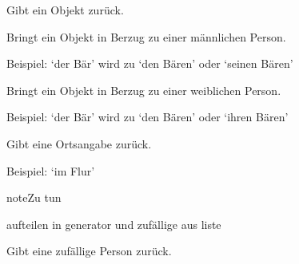 \documentclass[a4paper,12pt,oneside]{sphinxmanual}
\begin{document}

\begin{fulllineitems}
\label{module:pyzufall.generator.objekt}
Gibt ein Objekt zurück.

\end{fulllineitems}


\begin{fulllineitems}
\label{module:pyzufall.generator.objekt_m}
Bringt ein Objekt in Berzug zu einer männlichen Person.

Beispiel:
`der Bär' wird zu `den Bären' oder `seinen Bären'

\end{fulllineitems}


\begin{fulllineitems}
\label{module:pyzufall.generator.objekt_w}
Bringt ein Objekt in Berzug zu einer weiblichen Person.

Beispiel:
`der Bär' wird zu `den Bären' oder `ihren Bären'

\end{fulllineitems}


\begin{fulllineitems}
\label{module:pyzufall.generator.ort}
Gibt eine Ortsangabe zurück.

Beispiel: `im Flur'

\begin{notice}{note}{Zu tun}

aufteilen in generator und zufällige aus liste
\end{notice}

\end{fulllineitems}


\begin{fulllineitems}
\label{module:pyzufall.generator.person}
Gibt eine zufällige Person zurück.

\end{fulllineitems}
\end{document}
